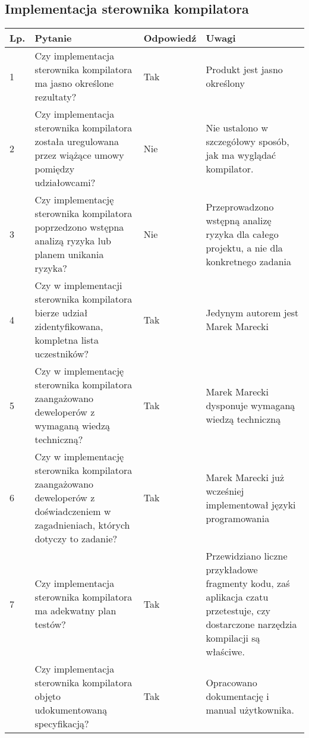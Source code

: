\documentclass[11pt,oneside,a4paper,titlepage,onecolumn]{article}
\begin{document}
\subsection{Implementacja sterownika kompilatora}

\phantom{...}

\begin{tabularx}{\textwidth}{|l|X|l|X|}
	\hline
	
	\hline
    Lp. & Pytanie & Odpowiedź & Uwagi \\ \hline
    
    1 
    & Czy implementacja sterownika kompilatora ma jasno 
    określone rezultaty?
    & Tak
    & Produkt jest jasno określony
    \\\hline

    2
	& Czy implementacja sterownika kompilatora została
	uregulowana	przez wiążące umowy pomiędzy udziałowcami?
	& Nie
	& Nie ustalono w szczegółowy sposób, jak ma wyglądać kompilator.
	\\\hline	
	
	3
	& Czy implementację sterownika kompilatora
	poprzedzono wstępna	analizą	ryzyka lub planem unikania ryzyka?
	& Nie
	& Przeprowadzono wstępną analizę ryzyka dla całego projektu, a
	nie dla konkretnego zadania
	\\\hline
	
	4
	& Czy w implementacji sterownika kompilatora bierze
	udział zidentyfikowana, kompletna lista uczestników?
	& Tak
	& Jedynym autorem jest Marek Marecki
	\\\hline

	5
	& Czy w implementację sterownika kompilatora
	zaangażowano deweloperów z wymaganą wiedzą techniczną?
	& Tak
	& Marek Marecki dysponuje wymaganą wiedzą techniczną
	\\\hline
	
	6
	& Czy w implementację sterownika kompilatora
	zaangażowano deweloperów z doświadczeniem w zagadnieniach,
	których dotyczy to zadanie?
	& Tak
	& Marek Marecki już wcześniej implementował języki programowania
	\\\hline
   
	7
	& Czy implementacja sterownika kompilatora ma
	adekwatny plan testów?
	& Tak
	& Przewidziano liczne przykładowe fragmenty kodu, zaś aplikacja
	czatu przetestuje, czy dostarczone narzędzia kompilacji są
	właściwe. 
	\\\hline	

	& Czy implementacja sterownika kompilatora objęto
	udokumentowaną specyfikacją?
	& Tak
	& Opracowano dokumentację i manual użytkownika.
	\\\hline
\end{tabularx}
\end{document}
